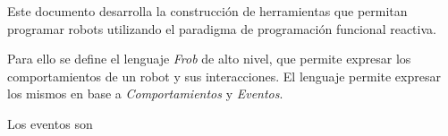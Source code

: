 
Este documento desarrolla la construcción de herramientas
que permitan programar robots utilizando el paradigma de
programación funcional reactiva.

Para ello se define el lenguaje \emph{Frob} de alto nivel,
que permite expresar los comportamientos de un robot y sus
interacciones.
El lenguaje permite expresar los mismos en base a
\emph{Comportamientos} y \emph{Eventos}.

Los eventos son 





% 
%
%
%
%
%
% 
% 
